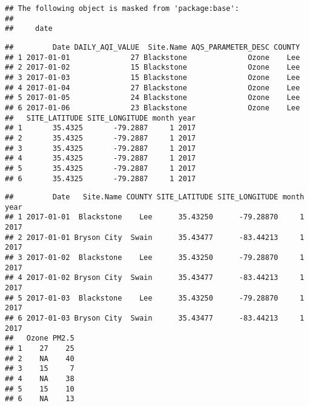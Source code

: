 \documentclass[]{article}
\newenvironment{Shaded}{\begin{snugshade}}{\end{snugshade}}
\newcommand{\KeywordTok}[1]{\textcolor[rgb]{0.13,0.29,0.53}{\textbf{#1}}}
\newcommand{\DataTypeTok}[1]{\textcolor[rgb]{0.13,0.29,0.53}{#1}}
\newcommand{\StringTok}[1]{\textcolor[rgb]{0.31,0.60,0.02}{#1}}
\newcommand{\CommentTok}[1]{\textcolor[rgb]{0.56,0.35,0.01}{\textit{#1}}}
\newcommand{\OperatorTok}[1]{\textcolor[rgb]{0.81,0.36,0.00}{\textbf{#1}}}
\newcommand{\NormalTok}[1]{#1}
\begin{document}
\begin{verbatim}
## The following object is masked from 'package:base':
## 
##     date
\end{verbatim}

\begin{Shaded}
\end{Shaded}

\begin{verbatim}
##         Date DAILY_AQI_VALUE  Site.Name AQS_PARAMETER_DESC COUNTY
## 1 2017-01-01              27 Blackstone              Ozone    Lee
## 2 2017-01-02              15 Blackstone              Ozone    Lee
## 3 2017-01-03              15 Blackstone              Ozone    Lee
## 4 2017-01-04              27 Blackstone              Ozone    Lee
## 5 2017-01-05              24 Blackstone              Ozone    Lee
## 6 2017-01-06              23 Blackstone              Ozone    Lee
##   SITE_LATITUDE SITE_LONGITUDE month year
## 1       35.4325       -79.2887     1 2017
## 2       35.4325       -79.2887     1 2017
## 3       35.4325       -79.2887     1 2017
## 4       35.4325       -79.2887     1 2017
## 5       35.4325       -79.2887     1 2017
## 6       35.4325       -79.2887     1 2017
\end{verbatim}

\begin{Shaded}
\end{Shaded}

\begin{verbatim}
##         Date   Site.Name COUNTY SITE_LATITUDE SITE_LONGITUDE month year
## 1 2017-01-01  Blackstone    Lee      35.43250      -79.28870     1 2017
## 2 2017-01-01 Bryson City  Swain      35.43477      -83.44213     1 2017
## 3 2017-01-02  Blackstone    Lee      35.43250      -79.28870     1 2017
## 4 2017-01-02 Bryson City  Swain      35.43477      -83.44213     1 2017
## 5 2017-01-03  Blackstone    Lee      35.43250      -79.28870     1 2017
## 6 2017-01-03 Bryson City  Swain      35.43477      -83.44213     1 2017
##   Ozone PM2.5
## 1    27    25
## 2    NA    40
## 3    15     7
## 4    NA    38
## 5    15    10
## 6    NA    13
\end{verbatim}
\end{document}
